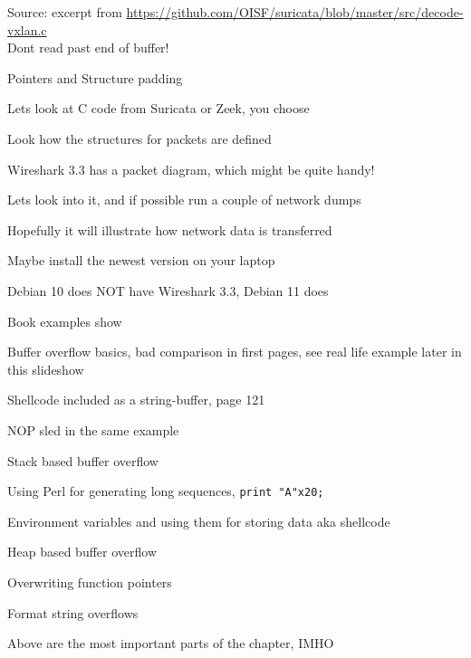 \documentclass[Screen16to9,17pt]{foils}
\begin{document}
Source: excerpt from \url{https://github.com/OISF/suricata/blob/master/src/decode-vxlan.c}\\
Dont read past end of buffer!



\begin{list2}
\item Pointers and Structure padding
\item Lets look at C code from Suricata or Zeek, you choose
\item Look how the structures for packets are defined
\end{list2}




\begin{list2}
\item Wireshark 3.3 has a packet diagram, which might be quite handy!
\item Lets look into it, and if possible run a couple of network dumps
\item Hopefully it will illustrate how network data is transferred
\item Maybe install the newest version on your laptop
\item Debian 10 does NOT have Wireshark 3.3, Debian 11 does
\end{list2}





Book examples show
\begin{list2}
\item Buffer overflow basics, bad comparison in first pages, see real life example later in this slideshow
\item Shellcode included as a string-buffer, page 121
\item NOP sled in the same example
\item Stack based buffer overflow
\item Using Perl for generating long sequences, \verb+print "A"x20;+
\item Environment variables and using them for storing data aka shellcode
\item Heap based buffer overflow
\item Overwriting function pointers
\item Format string overflows
\item Above are the most important parts of the chapter, IMHO
\end{list2}
\end{document}
